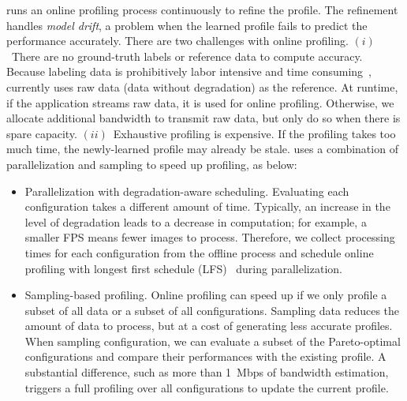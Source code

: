 
 \sysname{} runs an online profiling process
continuously to refine the profile. The refinement handles \textit{model drift},
a problem when the learned profile fails to predict the performance
accurately. There are two challenges with online profiling.  $(i)$~There are no
ground-truth labels or reference data to compute accuracy. Because labeling data
is prohibitively labor intensive and time consuming~\cite{russell2008labelme},
\sysname{} currently uses raw data (data without degradation) as the
reference. At runtime, if the application streams raw data, it is used for
online profiling. Otherwise, we allocate additional bandwidth to transmit raw
data, but only do so when there is spare capacity. $(ii)$~Exhaustive profiling
is expensive. If the profiling takes too much time, the newly-learned profile
may already be stale. \sysname{} uses a combination of parallelization and
sampling to speed up profiling, as below:

\begin{itemize}[leftmargin=*, topsep=3pt]

\item Parallelization with degradation-aware scheduling. Evaluating each
  configuration takes a different amount of time. Typically, an increase in the
  level of degradation leads to a decrease in computation; for example, a
  smaller FPS means fewer images to process. Therefore, we collect processing
  times for each configuration from the offline process and schedule online
  profiling with longest first schedule (LFS)~\cite{karger2010scheduling} during
  parallelization.

\item Sampling-based profiling. Online profiling can speed up if we only profile
  a subset of all data or a subset of all configurations.  Sampling data reduces
  the amount of data to process, but at a cost of generating less accurate
  profiles. When sampling configuration, we can evaluate a subset of the
  Pareto-optimal configurations and compare their performances with the existing
  profile. A substantial difference, such as more than \SI{1}{Mbps} of bandwidth
  estimation, triggers a full profiling over all configurations to update the
  current profile.

\end{itemize}



